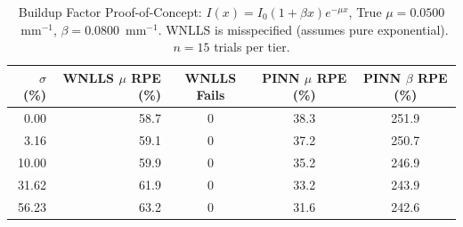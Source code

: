 \begin{table}[htbp]
\centering
\caption{Buildup Factor Proof-of-Concept: $I(x)=I_0(1+\beta x)e^{-\mu x}$, True $\mu=0.0500$~mm$^{-1}$, $\beta=0.0800$~mm$^{-1}$. WNLLS is misspecified (assumes pure exponential). $n=15$ trials per tier.}
\label{tab:buildup}
\small
\begin{tabular}{r|rc|cc}
\toprule
$\sigma$ (\%) & WNLLS $\mu$ RPE (\%) & WNLLS Fails & PINN $\mu$ RPE (\%) & PINN $\beta$ RPE (\%) \\
\midrule
0.00 & 58.7 & 0 & 38.3 & 251.9 \\
3.16 & 59.1 & 0 & 37.2 & 250.7 \\
10.00 & 59.9 & 0 & 35.2 & 246.9 \\
31.62 & 61.9 & 0 & 33.2 & 243.9 \\
56.23 & 63.2 & 0 & 31.6 & 242.6 \\
\bottomrule
\end{tabular}
\end{table}